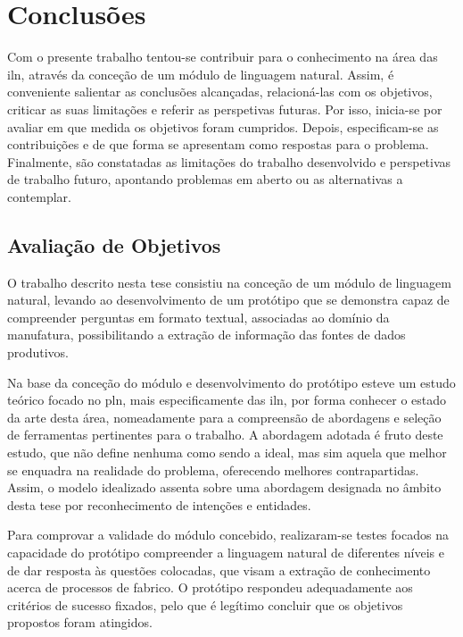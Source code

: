 \chapter{Conclusões}
\label{chap:Chapter7}
Com o presente trabalho tentou-se contribuir para o conhecimento na área das \gls{iln}, através da conceção de um módulo de linguagem natural. Assim, é conveniente salientar as conclusões alcançadas, relacioná-las com os objetivos, criticar as suas limitações e referir as perspetivas futuras. Por isso, inicia-se por avaliar em que medida os objetivos foram cumpridos. Depois, especificam-se as contribuições e de que forma se apresentam como respostas para o problema. Finalmente, são constatadas as limitações do trabalho desenvolvido e perspetivas de trabalho futuro, apontando problemas em aberto ou as alternativas a contemplar.

\section{Avaliação de Objetivos} 
\label{sec:chap07_goals_evaluation}
O trabalho descrito nesta tese consistiu na conceção de um módulo de linguagem natural, levando ao desenvolvimento de um protótipo que se demonstra capaz de compreender perguntas em formato textual, associadas ao domínio da manufatura, possibilitando a extração de informação das fontes de dados produtivos.

Na base da conceção do módulo e desenvolvimento do protótipo esteve um estudo teórico focado no \gls{pln}, mais especificamente das \gls{iln}, por forma conhecer o estado da arte desta área, nomeadamente para a compreensão de abordagens e seleção de ferramentas pertinentes para o trabalho. A abordagem adotada é fruto deste estudo, que não define nenhuma como sendo a ideal, mas sim aquela que melhor se enquadra na realidade do problema, oferecendo melhores contrapartidas. Assim, o modelo idealizado assenta sobre uma abordagem designada no âmbito desta tese por reconhecimento de intenções e entidades.

Para comprovar a validade do módulo concebido, realizaram-se testes focados na capacidade do protótipo compreender a linguagem natural de diferentes níveis e de dar resposta às questões colocadas, que visam a extração de conhecimento acerca de processos de fabrico. O protótipo respondeu adequadamente aos critérios de sucesso fixados, pelo que é legítimo concluir que os objetivos propostos foram atingidos.

